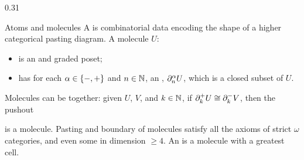 
\begin{columns}[t,totalwidth=\textwidth]

\begin{column}{0.31\textwidth}

\begin{block} {Atoms and molecules}
  A  is combinatorial data encoding the shape of a higher categorical pasting diagram.
  A molecule \( U \):
  \begin{itemize}
    \item is an  and graded poset; 
    \item has for each \( \alpha \in \left\{ {-, +} \right\} \) and \( n \in \mathbb{N} \), an , \( \partial_{n}^{\alpha} U \), which is a closed subset of \( U \).
  \end{itemize}
  Molecules can be  together: given \( U \), \( V \), and \( k \in \mathbb{N} \), if \( \partial_{k}^{+} U \cong \partial_{k}^{-} V \), then the pushout
  \begin{center}
  \end{center}
  is a molecule.
  Pasting and boundary of molecules satisfy all the axioms of strict \( \omega \)\nbd categories, and even some  in dimension \( \geq 4 \).
  An  is a molecule with a greatest cell.
\end{block}


\end{column}
\end{columns}
